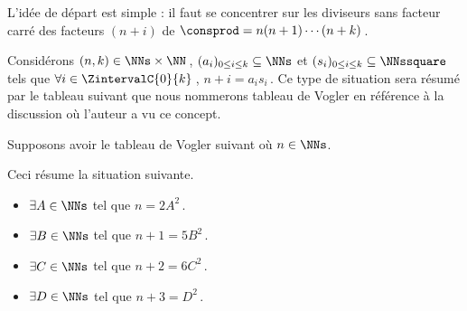 L'idée de départ est simple : il faut se concentrer sur les diviseurs sans facteur carré des facteurs $(n + i)$ de $\consprod = n (n + 1) \cdots (n + k)$\,. 


\begin{defi}
	Considérons $(n, k) \in \NNs \times \NN$\,,
	$( a_i )_{0 \leq i \leq k} \subseteq \NNs$
	et
	$( s_i )_{0 \leq i \leq k} \subseteq \NNssquare$
	tels que 
	$\forall i \in \ZintervalC{0}{k}$\,, $n + i = a_i s_i$\,.
	Ce type de situation sera résumé par le tableau suivant que nous nommerons tableau de Vogler en référence à la discussion où l'auteur a vu ce concept.

	\begin{center}
	\end{center}
\end{defi}




\begin{example}
	Supposons avoir le tableau de Vogler suivant où $n \in \NNs$.

	\begin{center}
	\end{center}
	
	Ceci résume la situation suivante. 
	
	\begin{itemize}
		\item $\exists A \in \NNs$ tel que $n     = 2 A^2$\,.

		\item $\exists B \in \NNs$ tel que $n + 1 = 5 B^2$\,.

		\item $\exists C \in \NNs$ tel que $n + 2 = 6 C^2$\,.

		\item $\exists D \in \NNs$ tel que $n + 3 = D^2  $\,.
	\end{itemize}
\end{example}


